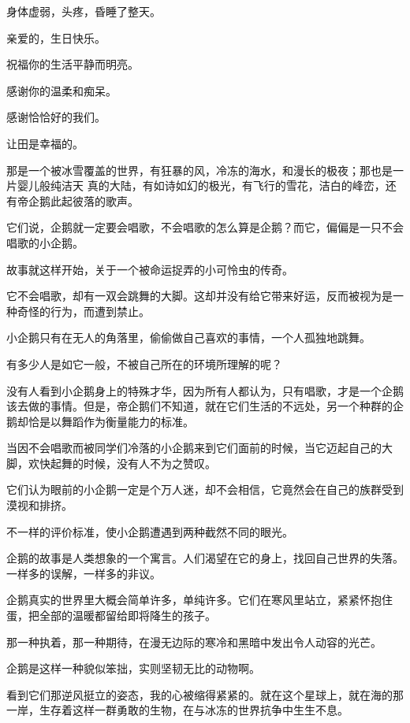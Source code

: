 \documentclass[12pt,a4paper]{article}
\def\blankrev{\vspace{1ex}}									%
\begin{document}
		身体虚弱，头疼，昏睡了整天。

	\endwriting



		亲爱的，生日快乐。\par
		祝福你的生活平静而明亮。

		\blankrev
		感谢你的温柔和痴呆。\par
		感谢恰恰好的我们。\par
		让田是幸福的。

	\endwriting



		那是一个被冰雪覆盖的世界，有狂暴的风，冷冻的海水，和漫长的极夜；那也是一片婴儿般纯洁天
	真的大陆，有如诗如幻的极光，有飞行的雪花，洁白的峰峦，还有帝企鹅此起彼落的歌声。

		\blankrev
		它们说，企鹅就一定要会唱歌，不会唱歌的怎么算是企鹅？而它，偏偏是一只不会唱歌的小企鹅。\par
		故事就这样开始，关于一个被命运捉弄的小可怜虫的传奇。

		\blankrev
		它不会唱歌，却有一双会跳舞的大脚。这却并没有给它带来好运，反而被视为是一种奇怪的行为，而遭到禁止。\par
		小企鹅只有在无人的角落里，偷偷做自己喜欢的事情，一个人孤独地跳舞。\par
		有多少人是如它一般，不被自己所在的环境所理解的呢？\par
		没有人看到小企鹅身上的特殊才华，因为所有人都认为，只有唱歌，才是一个企鹅该去做的事情。但是，帝企鹅们不知道，就在它们生活的不远处，另一个种群的企鹅却恰是以舞蹈作为衡量能力的标准。\par
		当因不会唱歌而被同学们冷落的小企鹅来到它们面前的时候，当它迈起自己的大脚，欢快起舞的时候，没有人不为之赞叹。\par
		它们认为眼前的小企鹅一定是个万人迷，却不会相信，它竟然会在自己的族群受到漠视和排挤。\par
		不一样的评价标准，使小企鹅遭遇到两种截然不同的眼光。

		\blankrev
		企鹅的故事是人类想象的一个寓言。人们渴望在它的身上，找回自己世界的失落。一样多的误解，一样多的非议。

		企鹅真实的世界里大概会简单许多，单纯许多。它们在寒风里站立，紧紧怀抱住蛋，把全部的温暖都留给即将降生的孩子。\par
		那一种执着，那一种期待，在漫无边际的寒冷和黑暗中发出令人动容的光芒。\par
		企鹅是这样一种貌似笨拙，实则坚韧无比的动物啊。\par
		看到它们那逆风挺立的姿态，我的心被缩得紧紧的。就在这个星球上，就在海的那一岸，生存着这样一群勇敢的生物，在与冰冻的世界抗争中生生不息。
\end{document}
